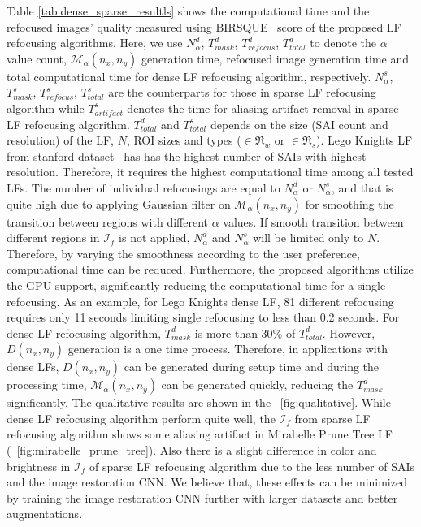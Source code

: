 Table \ref{tab:dense_sparse_resultls} shows the computational time and the refocused images' quality measured using BIRSQUE~\cite{brisque} score of the proposed LF refocusing algorithms.
Here, we use $N^{d}_{\alpha}$, $T^{d}_{mask}$, $T^{d}_{refocus}$, $T^{d}_{total}$ to denote the  $\alpha$ value count, $\mathcal{M}_{\alpha}(n_x,n_y)$ generation time, refocused image generation time and total computational time for dense LF refocusing algorithm, respectively. $N^{s}_{\alpha}$, $T^{s}_{mask}$, $T^{s}_{refocus}$, $T^{s}_{total}$ are the counterparts for those in sparse LF refocusing algorithm while $T^{s}_{artifact}$ denotes the time for aliasing artifact removal in sparse LF refocusing algorithm.
$T^{d}_{total}$ and $T^{s}_{total}$ depends on the size (SAI count and resolution) of the LF, $N$, ROI sizes and types ($\in \mathfrak{R}_{w}$ or $\in \mathfrak{R}_{s}$). Lego Knights LF from stanford dataset~\cite{stanfordnewdataset} has has the highest number of SAIs with highest resolution. Therefore, it requires the highest computational time among all tested LFs.  The number of individual refocusings are equal to $N^{d}_{\alpha}$ or $N^{s}_{\alpha}$, and that is quite high due to applying Gaussian filter on $\mathcal{M}_{\alpha}(n_x,n_y)$ for smoothing the transition between regions with different $\alpha$ values. If smooth transition between different regions in $\mathcal{I}_f$ is not applied, $N^{d}_{\alpha}$ and $N^{s}_{\alpha}$ will be limited only to $N$. Therefore, by varying the smoothness according to the user preference, computational time can be reduced. Furthermore, the proposed algorithms utilize the GPU support, significantly reducing the computational time for a single refocusing. As an example, for Lego Knights dense LF, 81 different refocusing requires only 11 seconds limiting single refocusing to less than 0.2 seconds.  For dense LF refocusing algorithm, $T^{d}_{mask}$ is more than $30\%$ of $T^{d}_{total}$. However, $D(n_x,n_y)$ generation is a one time process. Therefore, in applications with dense LFs, $D(n_x,n_y)$ can be generated during setup time and during the processing time, $\mathcal{M}_{\alpha}(n_x,n_y)$ can be generated quickly, reducing the $T^{d}_{mask}$ significantly. The qualitative results are shown in the \figurename~\ref{fig:qualitative}. While dense LF refocusing algorithm perform quite well, the $\mathcal{I}_f$ from sparse LF refocusing algorithm shows some aliasing artifact in Mirabelle Prune Tree LF (\figurename~\ref{fig:mirabelle_prune_tree}). Also there is a slight difference in color and brightness in $\mathcal{I}_f$ of sparse LF refocusing algorithm due to the less number of SAIs and the image restoration CNN. We believe that, these effects can be minimized by training the image restoration CNN further with larger datasets and better augmentations.

